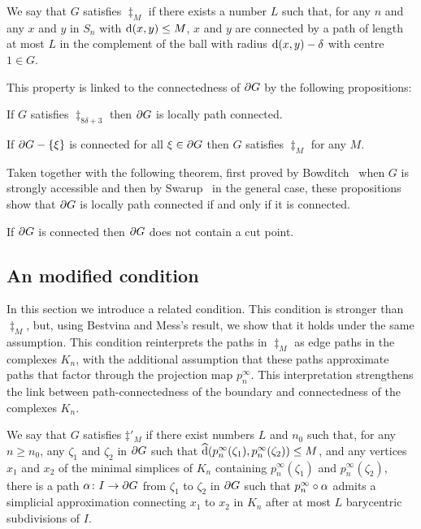 \documentclass[a4paper]{article}
\begin{document}
\begin{definition}
  We say that $G$ satisfies $\ddag_M$ if there exists a number $L$ such that,
  for any $n$ and any $x$ and $y$ in $S_n$ with $\operatorname{d}(x,y) \leq M$, $x$ and
  $y$ are connected by a path of length at most $L$ in the complement of the
  ball with radius $\operatorname{d}(x,y) - \delta$ with centre $1 \in G$.
\end{definition}

This property is linked to the connectedness of $\partial G$ by the following
propositions:

\begin{proposition}\cite[Proposition 3.2]{bestvinamess91}
  If $G$ satisfies $\ddag_{8\delta + 3}$ then $\partial G$ is locally path
  connected.
\end{proposition}

\begin{proposition}\cite[Proposition 3.3]{bestvinamess91}\label{prop:BM2}
  If $\partial G - \left\{\xi\right\}$ is connected for all $\xi \in \partial G$ then
  $G$ satisfies $\ddag_M$ for any $M$.
\end{proposition}

Taken together with the following theorem, first proved by
Bowditch~\cite{bowditch98b} when $G$ is strongly accessible and then by
Swarup~\cite{swarup96} in the general case, these propositions show that
$\partial G$ is locally path connected if and only if it is connected.

\begin{theorem}\cite{bowditch98b,swarup96}
  If $\partial G$ is connected then $\partial G$ does not contain a cut
  point.
\end{theorem}

\subsection{An modified condition}

In this section we introduce a related condition. This condition is stronger
than $\ddag_M$, but, using Bestvina and Mess's result, we show that it holds
under the same assumption. This condition reinterprets the paths in $\ddag_M$
as edge paths in the complexes $K_n$, with the additional assumption that
these paths approximate paths that factor through the projection map
$p^\infty_n$. This interpretation strengthens the link between
path-connectedness of the boundary and connectedness of the complexes $K_n$.

\begin{definition}
  We say that $G$ satisfies $\ddag'_M$ if there exist numbers $L$ and $n_0$
  such that, for any $n \geq n_0$, any $\zeta_1$ and $\zeta_2$ in $\partial
  G$ such that $\operatorname{\widehat{d}}(p^\infty_n(\zeta_1), p^\infty_n(\zeta_2)) \leq M$,
  and any vertices $x_1$ and $x_2$ of the minimal simplices of $K_n$
  containing $p^\infty_n(\zeta_1)$ and $p^\infty_n(\zeta_2)$, there is a path
  $\alpha\colon I\to \partial G$ from $\zeta_1$ to $\zeta_2$ in $\partial G$
  such that $p^\infty_n\circ\alpha$ admits a simplicial approximation
  connecting $x_1$ to $x_2$ in $K_n$ after at most $L$ barycentric
  subdivisions of $I$.
\end{definition}
\end{document}
